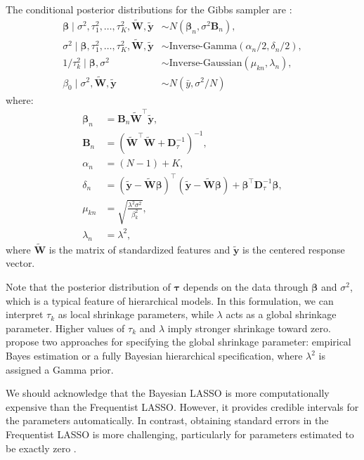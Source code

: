 The conditional posterior distributions for the Gibbs sampler are \cite{Park2008}:
\begin{align*}
	\boldsymbol{\beta} \mid \sigma^2, \tau_1^2, \dots, \tau_K^2, \tilde{\mathbf{W}}, \tilde{\mathbf{y}} &\sim {N}(\boldsymbol{\beta}_n, \sigma^2 \mathbf{B}_n), \\
	\sigma^2 \mid \boldsymbol{\beta}, \tau_1^2, \dots, \tau_K^2, \tilde{\mathbf{W}}, \tilde{\mathbf{y}} &\sim \text{Inverse-Gamma}(\alpha_n/2, \delta_n/2), \\
	1/\tau_k^2 \mid \boldsymbol{\beta}, \sigma^2 &\sim \text{Inverse-Gaussian}(\mu_{kn}, \lambda_n),\\
	\beta_0\mid \sigma^2, \tilde{\mathbf{W}}, \tilde{\mathbf{y}} &\sim N(\bar{y},\sigma^2/N) 
\end{align*}
where:
\begin{align*}
	\boldsymbol{\beta}_n &= \mathbf{B}_n \tilde{\mathbf{W}}^{\top} \tilde{\mathbf{y}}, \\
	\mathbf{B}_n &= \left( \tilde{\mathbf{W}}^{\top} \tilde{\mathbf{W}} + \mathbf{D}_{\tau}^{-1} \right)^{-1}, \\
	\alpha_n &= (N - 1) + K, \\
	\delta_n &= (\tilde{\mathbf{y}} - \tilde{\mathbf{W}} \boldsymbol{\beta})^{\top} (\tilde{\mathbf{y}} - \tilde{\mathbf{W}} \boldsymbol{\beta}) + \boldsymbol{\beta}^{\top} \mathbf{D}_{\tau}^{-1} \boldsymbol{\beta}, \\
	\mu_{kn} &= \sqrt{ \frac{ \lambda^2 \sigma^2 }{ \beta_k^2 } }, \\
	\lambda_n &= \lambda^2,
\end{align*}
where $\tilde{\mathbf{W}}$ is the matrix of standardized features and $\tilde{\mathbf{y}}$ is the centered response vector.

Note that the posterior distribution of $\boldsymbol{\tau}$ depends on the data through $\boldsymbol{\beta}$ and $\sigma^2$, which is a typical feature of hierarchical models. In this formulation, we can interpret \( \tau_k \) as local shrinkage parameters, while \( \lambda \) acts as a global shrinkage parameter. Higher values of \( \tau_k \) and \( \lambda \) imply stronger shrinkage toward zero. \cite{Park2008} propose two approaches for specifying the global shrinkage parameter: empirical Bayes estimation or a fully Bayesian hierarchical specification, where \( \lambda^2 \) is assigned a Gamma prior.

We should acknowledge that the Bayesian LASSO is more computationally expensive than the Frequentist LASSO. However, it provides credible intervals for the parameters automatically. In contrast, obtaining standard errors in the Frequentist LASSO is more challenging, particularly for parameters estimated to be exactly zero \cite{kyung2010penalized}.\\

